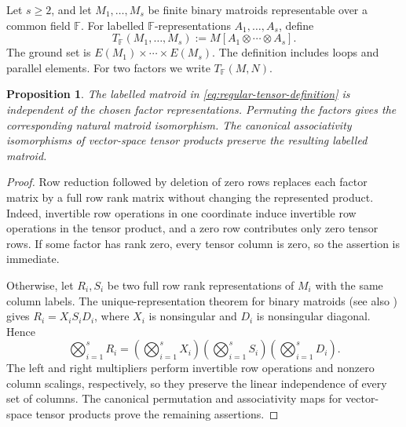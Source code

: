 \documentclass[12pt,a4paper]{article}
\numberwithin{equation}{section}
\newcommand{\F}{\mathbb F}
\newtheorem{proposition}[proposition]{Proposition}
\theoremstyle{definition}
\theoremstyle{remark}
\begin{document}
Let \(s\ge2\), and let \(M_1,\ldots,M_s\) be finite binary matroids
representable over a common field \(\F\).
For labelled \(\F\)-representations \(A_1,\ldots,A_s\), define
\begin{equation}\label{eq:regular-tensor-definition}
 T_{\F}(M_1,\ldots,M_s)
 :=M[A_1\otimes\cdots\otimes A_s].
\end{equation}
The ground set is \(E(M_1)\times\cdots\times E(M_s)\).
The definition includes loops and parallel elements.  For two factors
we write \(T_{\F}(M,N)\).

\begin{proposition}
\label{thm:basic-represented-product}
The labelled matroid in \eqref{eq:regular-tensor-definition} is
independent of the chosen factor representations.  Permuting the
factors gives the corresponding natural matroid isomorphism.
The canonical associativity isomorphisms of vector-space tensor
products preserve the resulting labelled matroid.
\end{proposition}
\begin{proof}
Row reduction followed by deletion of zero rows replaces each factor
matrix by a full row rank matrix without changing the represented
product.  Indeed, invertible row operations in one coordinate induce
invertible row operations in the tensor product, and a zero row
contributes only zero tensor rows.  If some factor has rank zero,
every tensor column is zero, so the assertion is immediate.

Otherwise, let \(R_i,S_i\) be two full row rank representations of
\(M_i\) with the same column labels.  The unique-representation theorem
for binary matroids
\cite{brylawski-lucas} (see also \cite[Proposition~6.6.5]{oxley}) gives
\(R_i=X_iS_iD_i\), where \(X_i\) is nonsingular and \(D_i\) is
nonsingular diagonal.  Hence
\[
 \bigotimes_{i=1}^s R_i=
 \left(\bigotimes_{i=1}^s X_i\right)
 \left(\bigotimes_{i=1}^s S_i\right)
 \left(\bigotimes_{i=1}^s D_i\right).
\]
The left and right multipliers perform invertible row operations and
nonzero column scalings, respectively, so they preserve the linear
independence of every set of columns.  The canonical permutation and associativity maps for
vector-space tensor products prove the remaining assertions.
\end{proof}
\end{document}
